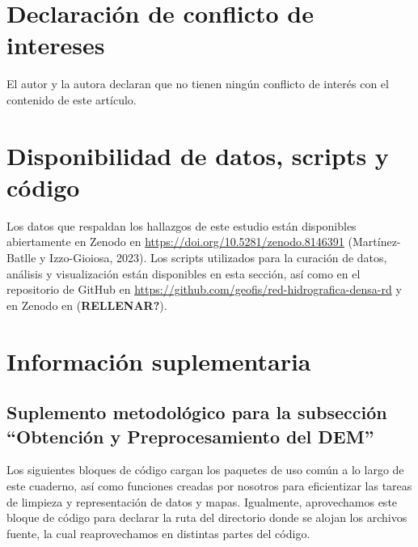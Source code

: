 \documentclass[spanish]{article}
\begin{document}
\hypertarget{declaraciuxf3n-de-conflicto-de-intereses}{%
\section*{Declaración de conflicto de
intereses}\label{declaraciuxf3n-de-conflicto-de-intereses}}

El autor y la autora declaran que no tienen ningún conflicto de interés
con el contenido de este artículo.

\hypertarget{disponibilidad-de-datos-scripts-y-cuxf3digo}{%
\section*{Disponibilidad de datos, scripts y
código}\label{disponibilidad-de-datos-scripts-y-cuxf3digo}}

Los datos que respaldan los hallazgos de este estudio están disponibles
abiertamente en Zenodo en \url{https://doi.org/10.5281/zenodo.8146391}
(Martínez-Batlle y Izzo-Gioiosa, 2023). Los scripts utilizados para la
curación de datos, análisis y visualización están disponibles en esta
sección, así como en el repositorio de GitHub en
\url{https://github.com/geofis/red-hidrografica-densa-rd} y en Zenodo en
\url{} (\textbf{RELLENAR?}).

\newpage

\hypertarget{infosupl}{%
\section*{Información suplementaria}\label{infosupl}}

\beginsupplement

\hypertarget{suplemento-metodoluxf3gico-para-la-subsecciuxf3n-obtenciuxf3n-y-preprocesamiento-del-dem}{%
\subsection*{Suplemento metodológico para la subsección ``Obtención y
Preprocesamiento del
DEM''}\label{suplemento-metodoluxf3gico-para-la-subsecciuxf3n-obtenciuxf3n-y-preprocesamiento-del-dem}}

Los siguientes bloques de código cargan los paquetes de uso común a lo
largo de este cuaderno, así como funciones creadas por nosotros para
eficientizar las tareas de limpieza y representación de datos y mapas.
Igualmente, aprovechamos este bloque de código para declarar la ruta del
directorio donde se alojan los archivos fuente, la cual reaprovechamos
en distintas partes del código.
\end{document}
